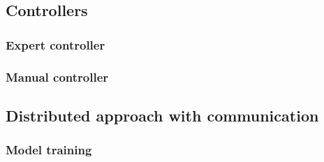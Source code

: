 \subsection{Controllers}
\label{subsec:task2controllers}

\subsubsection{Expert controller}
\label{subsubsec:omniscient2}

\subsubsection{Manual controller}
\label{subsubsec:manual2}

\subsection{Distributed approach with communication}
\label{subsec:task2comm}

\subsubsection{Model training}
\label{subsubsec:learnedcomm2}


